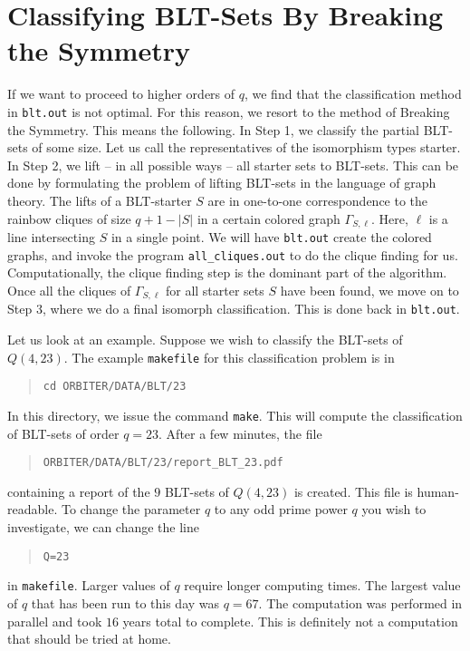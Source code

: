 \section{Classifying BLT-Sets By Breaking the Symmetry}


If we want to proceed to higher orders of $q$, we find that 
the classification method in \verb'blt.out' is not optimal.
For this reason, we resort to the method of Breaking the Symmetry.
This means the following. 
In Step 1, we classify the partial BLT-sets of some size. Let us call the representatives of the isomorphism types starter. 
In Step 2, we lift -- in all possible ways -- all starter sets to BLT-sets. 
This can be done by formulating the problem of lifting BLT-sets 
in the language of graph theory.
The lifts of a BLT-starter $S$ are in one-to-one correspondence to the 
rainbow cliques of size $q+1-|S|$ in a certain colored graph $\Gamma_{S,\ell}.$ 
Here, $\ell$ is a line intersecting $S$ in a single point.
We will have \verb'blt.out' create the colored graphs, 
and invoke the program \verb'all_cliques.out' to do the clique finding for us.
Computationally, the clique finding step is the dominant part of the algorithm.
Once all the cliques of $\Gamma_{S,\ell}$ for all starter sets $S$ 
have been found, we move on to Step 3, where we do a final isomorph classification.
This is done back in \verb'blt.out'.


\bigskip

Let us look at an example. Suppose we wish to classify the BLT-sets 
of $Q(4,23).$
The example \verb'makefile' for this classification problem 
is in 
\begin{quote}
\verb'cd ORBITER/DATA/BLT/23'\\
\end{quote}
In this directory, we issue the command 
\verb'make'.
This will compute the classification of BLT-sets of order $q=23$. 
After a few minutes, the file 
\begin{quote}
\verb'ORBITER/DATA/BLT/23/report_BLT_23.pdf'
\end{quote}
containing a report of the $9$ BLT-sets of $Q(4,23)$ is created. 
This file is human-readable. 
To change the parameter $q$ to any odd prime power $q$ you wish to investigate, 
we can change the line
\begin{quote}
\verb'Q=23'
\end{quote}
in \verb'makefile'. Larger values of $q$ require longer computing times. 
The largest value of $q$ that has been 
run to this day was $q=67$. 
The computation was performed in parallel and took $16$ years 
total to complete. This is definitely not a computation 
that should be tried at home.

